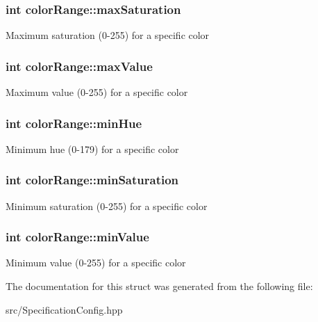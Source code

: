 \subsubsection[{\texorpdfstring{max\+Saturation}{maxSaturation}}]{\setlength{\rightskip}{0pt plus 5cm}int color\+Range\+::max\+Saturation}\hypertarget{structcolorRange_abf29d6b695efd30da709e39b4c94b638}{}\label{structcolorRange_abf29d6b695efd30da709e39b4c94b638}
Maximum saturation (0-\/255) for a specific color 
\subsubsection[{\texorpdfstring{max\+Value}{maxValue}}]{\setlength{\rightskip}{0pt plus 5cm}int color\+Range\+::max\+Value}\hypertarget{structcolorRange_a1653821b47f0de18315b0d7f3bc54c13}{}\label{structcolorRange_a1653821b47f0de18315b0d7f3bc54c13}
Maximum value (0-\/255) for a specific color 
\subsubsection[{\texorpdfstring{min\+Hue}{minHue}}]{\setlength{\rightskip}{0pt plus 5cm}int color\+Range\+::min\+Hue}\hypertarget{structcolorRange_a9679488c6339699971dd203817216c0c}{}\label{structcolorRange_a9679488c6339699971dd203817216c0c}
Minimum hue (0-\/179) for a specific color 
\subsubsection[{\texorpdfstring{min\+Saturation}{minSaturation}}]{\setlength{\rightskip}{0pt plus 5cm}int color\+Range\+::min\+Saturation}\hypertarget{structcolorRange_a98acafa32db912103eeb515b6f8308a0}{}\label{structcolorRange_a98acafa32db912103eeb515b6f8308a0}
Minimum saturation (0-\/255) for a specific color 
\subsubsection[{\texorpdfstring{min\+Value}{minValue}}]{\setlength{\rightskip}{0pt plus 5cm}int color\+Range\+::min\+Value}\hypertarget{structcolorRange_a51150443fec527eab104fc39d6811bd8}{}\label{structcolorRange_a51150443fec527eab104fc39d6811bd8}
Minimum value (0-\/255) for a specific color 

The documentation for this struct was generated from the following file\+:\begin{DoxyCompactItemize}
\item 
src/Specification\+Config.\+hpp\end{DoxyCompactItemize}
